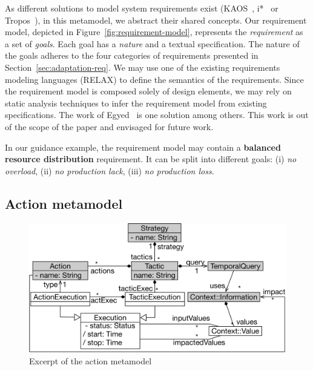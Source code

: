 As different solutions to model system requirements exist (\eg KAOS~\cite{dardenne1993goal}, i*~\cite{yu2011modelling} or Tropos~\cite{DBLP:journals/aamas/BrescianiPGGM04}), in this metamodel, we abstract their shared concepts.
Our requirement model, depicted in Figure~\ref{fig:requirement-model}, represents the \textit{requirement} as a set of \textit{goals}.
Each goal has a \textit{nature} and a textual specification.
The nature of the goals adheres to the four categories of requirements presented in Section~\ref{sec:adaptation-req}.
We may use one of the existing requirements modeling languages (\eg RELAX) to define the semantics of the requirements. Since the requirement model is composed solely of design elements, we may rely on static analysis techniques to infer the requirement model from existing specifications. The work of Egyed~\cite{egyed01} is one solution among others. This work is out of the scope of the paper and envisaged for future work. 

In our guidance example, the requirement model may contain a \textbf{balanced resource distribution} requirement. It can be split into different goals: (i) \textit{no overload}, (ii) \textit{no production lack}, (iii) \textit{no production loss}.

\subsection{Action metamodel}
\label{sec:action-mm}

\begin{figure}
	\centering
	\includegraphics[width=\linewidth]{img/chapt-tkm/mm/actionModel}
	\caption{Excerpt of the action metamodel}
	\label{fig:action-mm}
\end{figure}

